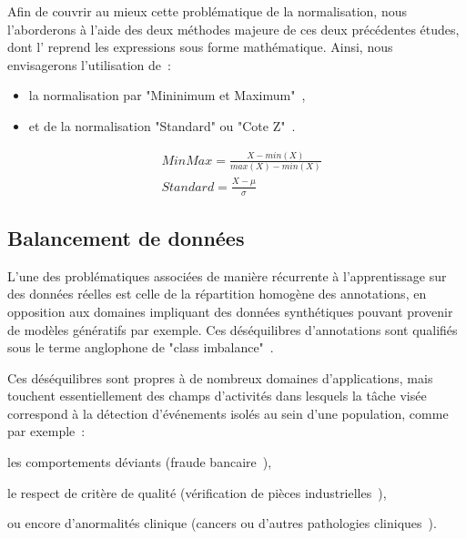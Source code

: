 Afin de couvrir au mieux cette problématique de la normalisation, nous l'aborderons à l'aide des deux méthodes majeure de ces deux précédentes études, dont l' reprend les expressions sous forme mathématique. Ainsi, nous envisagerons l'utilisation de~:
\begin{itemize}
    \item la normalisation par "Mininimum et Maximum"~\cite{Juszczak2002},
    \item et de la normalisation "Standard" ou "Cote Z"~\cite{Celebi2007}.
\end{itemize}\par

\begin{equation} 
    \label{eq:scaling_methods}
    \begin{split}
    &MinMax=\frac{X-min(X)}{max(X)-min(X)}  \\
    &Standard=\frac{X-\mu{}}{\sigma}	    
    \end{split}
\end{equation}

\subsection{Balancement de données}
L'une des problématiques associées de manière récurrente à l'apprentissage sur des données réelles est celle de la répartition homogène des annotations, en opposition aux domaines impliquant des données synthétiques pouvant provenir de modèles génératifs par exemple. Ces déséquilibres d'annotations sont qualifiés sous le terme anglophone de "class imbalance"~\cite{Prati2009, He2009}.\par

Ces déséquilibres sont propres à de nombreux domaines d'applications, mais touchent essentiellement des champs d'activités dans lesquels la tâche visée correspond à la détection d'événements isolés au sein d'une population, comme par exemple~: 
\begin{inlinerate}
    \item les comportements déviants (fraude bancaire~\cite{Phua2004}),
    \item le respect de critère de qualité (vérification de pièces industrielles~\cite{Wu2018}),
    \item ou encore d'anormalités clinique (cancers ou d'autres pathologies cliniques~\cite{Celebi2007}).
\end{inlinerate}\par

